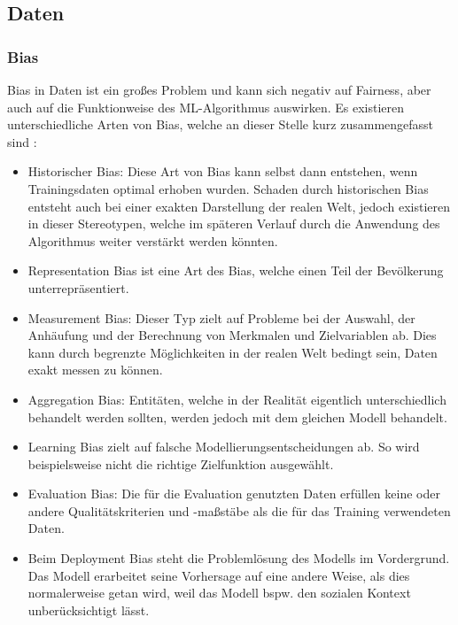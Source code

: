 \subsection{Daten}
\subsubsection{Bias}
Bias in Daten ist ein großes Problem und kann sich negativ auf Fairness, aber auch auf die Funktionweise des ML-Algorithmus auswirken. Es existieren unterschiedliche Arten von Bias, welche an dieser Stelle kurz zusammengefasst sind \cite{suresh2021framework}: 
\begin{itemize}
    \item Historischer Bias: Diese Art von Bias kann selbst dann entstehen, wenn Trainingsdaten optimal erhoben wurden. Schaden durch historischen Bias entsteht auch bei einer exakten Darstellung der realen Welt, jedoch existieren in dieser Stereotypen, welche im späteren Verlauf durch die Anwendung des Algorithmus weiter verstärkt werden könnten.
    \item Representation Bias ist eine Art des Bias, welche einen Teil der Bevölkerung unterrepräsentiert.
    \item Measurement Bias: Dieser Typ zielt auf Probleme bei der Auswahl, der Anhäufung und der Berechnung von Merkmalen und Zielvariablen ab. Dies kann durch begrenzte Möglichkeiten in der realen Welt bedingt sein, Daten exakt messen zu können.
    \item Aggregation Bias: Entitäten, welche in der Realität eigentlich unterschiedlich behandelt werden sollten, werden jedoch mit dem gleichen Modell behandelt.
    \item Learning Bias zielt auf falsche Modellierungsentscheidungen ab. So wird beispielsweise nicht die richtige Zielfunktion ausgewählt.
    \item Evaluation Bias: Die für die Evaluation genutzten Daten erfüllen keine oder andere Qualitätskriterien und -maßstäbe als die für das Training verwendeten Daten.
    \item Beim Deployment Bias steht die Problemlösung des Modells im Vordergrund. Das Modell erarbeitet seine Vorhersage auf eine andere Weise, als dies normalerweise getan wird, weil das Modell bspw. den sozialen Kontext unberücksichtigt lässt.
\end{itemize}

